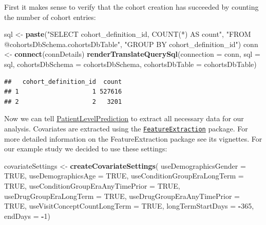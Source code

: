 \documentclass[11pt]{book}
\newenvironment{Shaded}{\begin{snugshade}}{\end{snugshade}}
\newcommand{\KeywordTok}[1]{\textcolor[rgb]{0.13,0.29,0.53}{\textbf{#1}}}
\newcommand{\DataTypeTok}[1]{\textcolor[rgb]{0.13,0.29,0.53}{#1}}
\newcommand{\DecValTok}[1]{\textcolor[rgb]{0.00,0.00,0.81}{#1}}
\newcommand{\StringTok}[1]{\textcolor[rgb]{0.31,0.60,0.02}{#1}}
\newcommand{\OtherTok}[1]{\textcolor[rgb]{0.56,0.35,0.01}{#1}}
\newcommand{\OperatorTok}[1]{\textcolor[rgb]{0.81,0.36,0.00}{\textbf{#1}}}
\newcommand{\NormalTok}[1]{#1}
\theoremstyle{definition}
\theoremstyle{definition}
\theoremstyle{definition}
\theoremstyle{remark}
\begin{document}
First it makes sense to verify that the cohort creation has succeeded by
counting the number of cohort entries:

\begin{Shaded}
\begin{Highlighting}[]
\NormalTok{sql <-}\StringTok{ }\KeywordTok{paste}\NormalTok{(}\StringTok{"SELECT cohort_definition_id, COUNT(*) AS count"}\NormalTok{,}
\StringTok{"FROM @cohortsDbSchema.cohortsDbTable"}\NormalTok{,}
\StringTok{"GROUP BY cohort_definition_id"}\NormalTok{)}
\NormalTok{conn <-}\StringTok{ }\KeywordTok{connect}\NormalTok{(connDetails)}
\KeywordTok{renderTranslateQuerySql}\NormalTok{(}\DataTypeTok{connection =}\NormalTok{ conn, }
                        \DataTypeTok{sql =}\NormalTok{ sql,}
                        \DataTypeTok{cohortsDbSchema =}\NormalTok{ cohortsDbSchema,}
                        \DataTypeTok{cohortsDbTable =}\NormalTok{ cohortsDbTable)}
\end{Highlighting}
\end{Shaded}

\begin{verbatim}
##   cohort_definition_id  count
## 1                    1 527616
## 2                    2   3201
\end{verbatim}

Now we can tell
\href{https://ohdsi.github.io/PatientLevelPrediction/}{PatientLevelPrediction}
to extract all necessary data for our analysis. Covariates are extracted
using the
\href{https://ohdsi.github.io/FeatureExtraction/}{\texttt{FeatureExtraction}}
package. For more detailed information on the FeatureExtraction package
see its vignettes. For our example study we decided to use these
settings:

\begin{Shaded}
\begin{Highlighting}[]
\NormalTok{covariateSettings <-}\StringTok{ }\KeywordTok{createCovariateSettings}\NormalTok{(}
\DataTypeTok{useDemographicsGender =} \OtherTok{TRUE}\NormalTok{,}
                          \DataTypeTok{useDemographicsAge =} \OtherTok{TRUE}\NormalTok{,}
                          \DataTypeTok{useConditionGroupEraLongTerm =} \OtherTok{TRUE}\NormalTok{,}
                          \DataTypeTok{useConditionGroupEraAnyTimePrior =} \OtherTok{TRUE}\NormalTok{,}
                          \DataTypeTok{useDrugGroupEraLongTerm =} \OtherTok{TRUE}\NormalTok{,}
                          \DataTypeTok{useDrugGroupEraAnyTimePrior =} \OtherTok{TRUE}\NormalTok{,}
                          \DataTypeTok{useVisitConceptCountLongTerm =} \OtherTok{TRUE}\NormalTok{,}
                          \DataTypeTok{longTermStartDays =} \OperatorTok{-}\DecValTok{365}\NormalTok{,}
                          \DataTypeTok{endDays =} \OperatorTok{-}\DecValTok{1}\NormalTok{)}
\end{Highlighting}
\end{Shaded}
\end{document}
